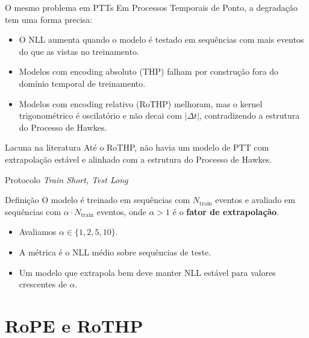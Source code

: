 \documentclass[aspectratio=169]{beamer}
\begin{document}
\begin{frame}{O mesmo problema em PTTs}
  Em Processos Temporais de Ponto, a degradação tem uma forma precisa:
  \begin{itemize}
    \item O NLL aumenta quando o modelo é testado em sequências com mais
          eventos do que as vistas no treinamento.
    \item Modelos com encoding absoluto (THP) falham por construção fora
          do domínio temporal de treinamento.
    \item Modelos com encoding relativo (RoTHP) melhoram, mas o kernel
          trigonométrico é oscilatório e não decai com $|\Delta t|$,
          contradizendo a estrutura do Processo de Hawkes.
  \end{itemize}
  \begin{alertblock}{Lacuna na literatura}
    Até o RoTHP, não havia um modelo de PTT com extrapolação estável
    e alinhado com a estrutura do Processo de Hawkes.
  \end{alertblock}
\end{frame}

\begin{frame}{Protocolo \emph{Train Short, Test Long}}
  \begin{block}{Definição}
    O modelo é treinado em sequências com $N_{\text{train}}$ eventos e
    avaliado em sequências com $\alpha \cdot N_{\text{train}}$ eventos,
    onde $\alpha > 1$ é o \textbf{fator de extrapolação}.
  \end{block}
  \vspace{0.5em}
  \begin{itemize}
    \item Avaliamos $\alpha \in \{1, 2, 5, 10\}$.
    \item A métrica é o NLL médio sobre sequências de teste.
    \item Um modelo que extrapola bem deve manter NLL estável
          para valores crescentes de $\alpha$.
  \end{itemize}
\end{frame}

\section{RoPE e RoTHP}
\end{document}
